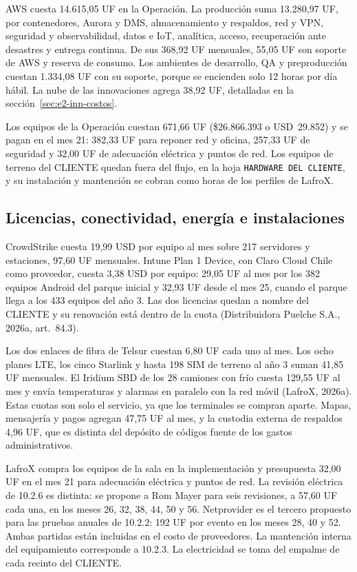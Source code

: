 AWS cuesta 14.615,05 UF en la Operación. La producción suma 13.280,97 UF, por contenedores, Aurora y DMS, almacenamiento y respaldos, red y VPN, seguridad y observabilidad, datos e IoT, analítica, acceso, recuperación ante desastres y entrega continua. De sus 368,92 UF mensuales, 55,05 UF son soporte de AWS y reserva de consumo. Los ambientes de desarrollo, QA y preproducción cuestan 1.334,08 UF con su soporte, porque se encienden solo 12 horas por día hábil. La nube de las innovaciones agrega 38,92 UF, detalladas en la sección~\ref{sec:e2-inn-costos}.

Los equipos de la Operación cuestan 671,66 UF (\$26.866.393 o USD~29.852) y se pagan en el mes 21: 382,33 UF para reponer red y oficina, 257,33 UF de seguridad y 32,00 UF de adecuación eléctrica y puntos de red. Los equipos de terreno del CLIENTE quedan fuera del flujo, en la hoja \texttt{HARDWARE DEL CLIENTE}, y su instalación y mantención se cobran como horas de los perfiles de LafroX.

\subsection{Licencias, conectividad, energía e instalaciones}
\label{sec:e2-op-licencias}

CrowdStrike cuesta 19,99 USD por equipo al mes sobre 217 servidores y estaciones, 97,60 UF mensuales. Intune Plan 1 Device, con Claro Cloud Chile como proveedor, cuesta 3,38 USD por equipo: 29,05 UF al mes por los 382 equipos Android del parque inicial y 32,93 UF desde el mes 25, cuando el parque llega a los 433 equipos del año 3. Las dos licencias quedan a nombre del CLIENTE y su renovación está dentro de la cuota (Distribuidora Puelche S.A., 2026a, art.~84.3).

Los dos enlaces de fibra de Telsur cuestan 6,80 UF cada uno al mes. Los ocho planes LTE, los cinco Starlink y hasta 198 SIM de terreno al año 3 suman 41,85 UF mensuales. El Iridium SBD de los 28 camiones con frío cuesta 129,55 UF al mes y envía temperaturas y alarmas en paralelo con la red móvil (LafroX, 2026a). Estas cuotas son solo el servicio, ya que los terminales se compran aparte. Mapas, mensajería y pagos agregan 47,75 UF al mes, y la custodia externa de respaldos 4,96 UF, que es distinta del depósito de códigos fuente de los gastos administrativos.

LafroX compra los equipos de la sala en la implementación y presupuesta 32,00 UF en el mes 21 para adecuación eléctrica y puntos de red. La revisión eléctrica de 10.2.6 es distinta: se propone a Rom Mayer para seis revisiones, a 57,60 UF cada una, en los meses 26, 32, 38, 44, 50 y 56. Netprovider es el tercero propuesto para las pruebas anuales de 10.2.2: 192 UF por evento en los meses 28, 40 y 52. Ambas partidas están incluidas en el costo de proveedores. La mantención interna del equipamiento corresponde a 10.2.3. La electricidad se toma del empalme de cada recinto del CLIENTE.

